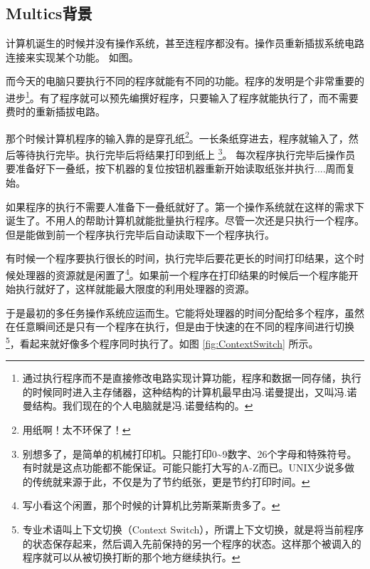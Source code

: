 \begin{insertnote}
\subsection*{Multics背景}

%


计算机诞生的时候并没有操作系统，甚至连程序都没有。操作员重新插拔系统电路连接来实现某个功能。
如图。

而今天的电脑只要执行不同的程序就能有不同的功能。程序的发明是个非常重要的进步\footnote{通过执行程序而不是直接修改电路实现计算功能，程序和数据一同存储，执行的时候同时进入主存储器，这种结构的计算机最早由冯.诺曼提出，又叫冯.诺曼结构。我们现在的个人电脑就是冯.诺曼结构的。}。有了程序就可以预先编撰好程序，只要输入了程序就能执行了，而不需要费时的重新插拔电路。

那个时候计算机程序的输入靠的是穿孔纸\footnote{用纸啊！太不环保了！}。一长条纸穿进去，程序就输入了，然后等待执行完毕。执行完毕后将结果打印到纸上
\footnote{别想多了，是简单的机械打印机。只能打印0\textasciitilde{}9数字、26个字母和特殊符号。有时就是这点功能都不能保证。可能只能打大写的A-Z而已。UNIX少说多做的传统就来源于此，不仅是为了节约纸张，更是节约打印时间。}。
每次程序执行完毕后操作员要准备好下一叠纸，按下机器的复位按钮机器重新开始读取纸张并执行....周而复始。

如果程序的执行不需要人准备下一叠纸就好了。第一个操作系统就在这样的需求下诞生了。不用人的帮助计算机就能批量执行程序。尽管一次还是只执行一个程序。但是能做到前一个程序执行完毕后自动读取下一个程序执行。

有时候一个程序要执行很长的时间，执行完毕后要花更长的时间打印结果，这个时候处理器的资源就是闲置了\footnote{写小看这个闲置，那个时候的计算机比劳斯莱斯贵多了。}。如果前一个程序在打印结果的时候后一个程序能开始执行就好了，这样就能最大限度的利用处理器的资源。

于是最初的多任务操作系统应运而生。它能将处理器的时间分配给多个程序，虽然在任意瞬间还是只有一个程序在执行，但是由于快速的在不同的程序间进行切换\footnote{专业术语叫上下文切换（Context Switch），所谓上下文切换，就是将当前程序的状态保存起来，然后调入先前保持的另一个程序的状态。这样那个被调入的程序就可以从被切换打断的那个地方继续执行。}，看起来就好像多个程序同时执行了。如图 \ref{fig:ContextSwitch}  所示。



\end{insertnote}
